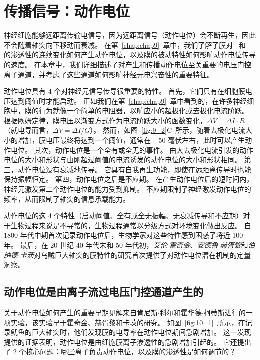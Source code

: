 \chapter{传播信号：动作电位} \label{chap:chap10}

神经细胞能够远距离传输电信号，因为远距离信号（动作电位）会不断再生，因此不会随着轴突向下移动而衰减。
在第~\ref{chap:chap9}~章中，我们了解了膜对~ 和~ 的渗透性的连续变化如何产生动作电位，以及膜的被动特性如何影响动作电位传导的速度。
在本章中，我们详细描述了对产生和传播动作电位至关重要的电压门控离子通道，并考虑了这些通道如何影响神经元电兴奋性的重要特征。


动作电位具有 4 个对神经元信号传导很重要的特性。
首先，它们只有在细胞膜电压达到阈值时才能启动。
正如我们在第~\ref{chap:chap9}~章中看到的，在许多神经细胞中，膜的行为就像一个简单的电阻器，以响应小的超极化或去极化电流阶跃。
根据欧姆定律，膜电压以渐变方式作为电流阶跃大小的函数变化，$\Delta V = \Delta I \cdot R$（就电导而言，$\Delta V = \Delta I / G$）。
然而，如图~\ref{fig:9_2}C~所示，随着去极化电流大小的增加，膜电压最终将达到一个阈值，通常在 −50 毫伏左右，此时可以产生动作电位。
其次，动作电位是一个全有或全无的事件。
由大去极化电流引发的动作电位的大小和形状与由刚超过阈值的电流诱发的动作电位的大小和形状相同。
第三，动作电位没有衰减地传导。
它具有自我再生功能，即使在远距离传导时也能保持振幅恒定。
第四，动作电位之后是不应期。
在产生动作电位后的短时间内，神经元激发第二个动作电位的能力受到抑制。
不应期限制了神经激发动作电位的频率，从而限制了轴突的信息承载能力。


动作电位的这 4 个特性（启动阈值、全有或全无振幅、无衰减传导和不应期）对于生物过程来说是不寻常的，生物过程通常以分级方式对环境变化做出反应。
自 1800 年代中期首次记录动作电位后，生物学家对这些特性感到困惑了将近 100 年。
最后，在 20 世纪 40 年代末和 50 年代初，\textit{艾伦$\cdot$霍奇金}、\textit{安德鲁$\cdot$赫胥黎}和\textit{伯纳德$\cdot$卡茨}对乌贼巨大轴突的膜特性的研究首次提供了对动作电位潜在机制的定量洞察。



\section{动作电位是由离子流过电压门控通道产生的}

关于动作电位如何产生的重要早期见解来自肯尼斯$\cdot$科尔和霍华德$\cdot$柯蒂斯进行的一项实验，该实验早于霍奇金、赫胥黎和卡茨的研究。
如图~\ref{fig:10_1}~所示，在记录鱿鱼的巨大轴突时，他们发现膜的电导率在动作电位期间急剧增加。
这一发现提供的证据表明，动作电位是由细胞膜离子渗透性的急剧增加引起的。
它还提出了 2 个核心问题：哪些离子负责动作电位，以及膜的渗透性是如何调节的？


